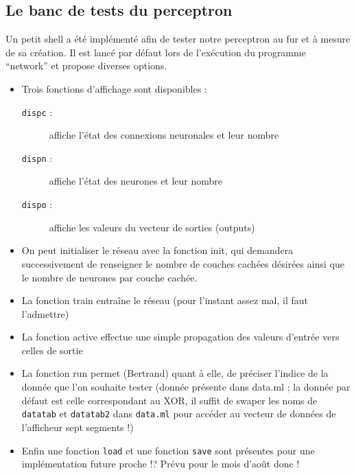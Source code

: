 \documentclass[a4paper,12pt]{report}
\begin{document}

\subsection{Le banc de tests du perceptron} %
\label{subsec:le_banc_de_tests_du_perceptron}

Un petit shell a \'et\'e impl\'ement\'e afin de tester notre perceptron
au fur et \`a mesure de sa cr\'eation. Il est lanc\'e par d\'efaut lors
de l'ex\'ecution du programme ``network'' et propose diverses
options. 
\begin{itemize}
	\item Trois fonctions d'affichage sont disponibles : 
\begin{description}
	\item[\verb!dispc! :] affiche l'\'etat des connexions neuronales et leur nombre
	\item[\verb!dispn! :] affiche l'\'etat des neurones et leur nombre
	\item[\verb!dispo! :] affiche les valeurs du vecteur de sorties (outputs)
\end{description}

\item On peut initialiser le r\'eseau avec la fonction init, qui demandera
successivement de renseigner le nombre de couches cach\'ees d\'esir\'ees
ainsi que le nombre de neurones par couche cach\'ee.

\item La fonction train entra\^ine le r\'eseau (pour l'instant assez mal, il
faut l'admettre) 

\item La fonction active effectue une simple propagation des valeurs
d'entr\'ee vers celles de sortie

\item La fonction run permet (Bertrand) quant \`a elle, de pr\'eciser l'indice de la donn\'ee
que l'on souhaite tester (donn\'ee pr\'esente dans data.ml ; la donn\'ee
par d\'efaut est celle correspondant au XOR, il suffit de swaper les
noms de \verb!datatab! et \verb!datatab2! dans \verb!data.ml! pour acc\'eder au vecteur de
donn\'ees de l'afficheur sept segments !)

\item Enfin une fonction \verb!load! et une fonction \verb!save! sont pr\'esentes pour une
impl\'ementation future proche !? Prévu pour le mois d'août donc !

\end{itemize}
\end{document}
